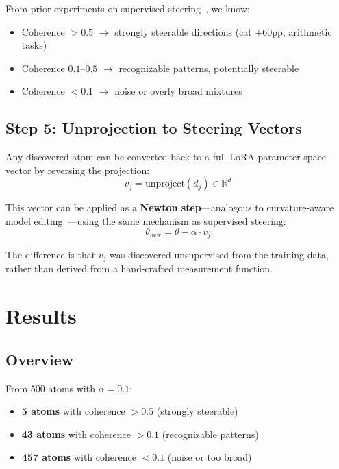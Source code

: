 \documentclass{article} %
\begin{document}
From prior experiments on supervised steering~\citep{bae2022if}, we know:
\begin{itemize}
\item Coherence $> 0.5$ $\rightarrow$ strongly steerable directions (cat $+60$pp, arithmetic tasks)
\item Coherence $0.1$--$0.5$ $\rightarrow$ recognizable patterns, potentially steerable
\item Coherence $< 0.1$ $\rightarrow$ noise or overly broad mixtures
\end{itemize}

\subsection{Step 5: Unprojection to Steering Vectors}

Any discovered atom can be converted back to a full LoRA parameter-space vector by reversing the projection:
\begin{equation}
v_j = \text{unproject}(d_j) \in \mathbb{R}^d
\end{equation}

This vector can be applied as a \textbf{Newton step}---analogous to curvature-aware model editing~\citep{ikram2026crispedit}---using the same mechanism as supervised steering:
\begin{equation}
\theta_{\text{new}} = \theta - \alpha \cdot v_j
\end{equation}

The difference is that $v_j$ was discovered unsupervised from the training data, rather than derived from a hand-crafted measurement function.


\section{Results}

\subsection{Overview}

From 500 atoms with $\alpha = 0.1$:
\begin{itemize}
\item \textbf{5 atoms} with coherence $> 0.5$ (strongly steerable)
\item \textbf{43 atoms} with coherence $> 0.1$ (recognizable patterns)
\item \textbf{457 atoms} with coherence $< 0.1$ (noise or too broad)
\end{itemize}
\end{document}
